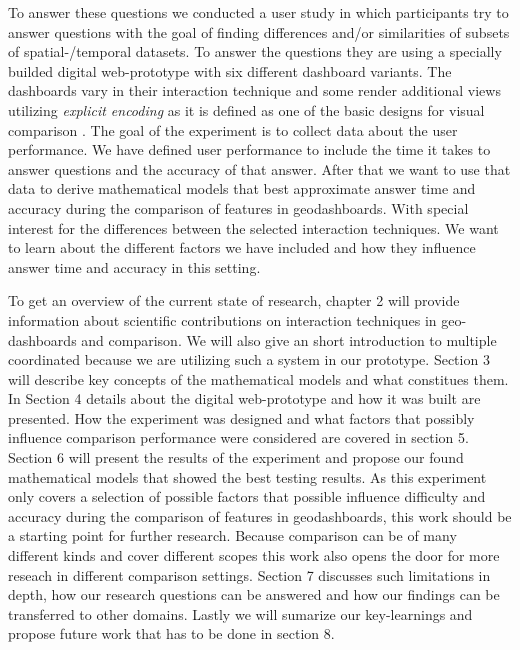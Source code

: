 To answer these questions we conducted a user study in which participants try to answer
questions with the goal of finding differences and/or similarities of subsets
of spatial-/temporal datasets. To answer the
questions they are using a specially builded digital web-prototype with six different dashboard
variants. The dashboards vary in their interaction technique and some render additional views
utilizing \textit{explicit encoding} as it is defined as one of the basic designs for visual
comparison \citep*{Gleicher.2018}. The goal of the experiment is to collect data about the user
performance. We have defined user performance to include the time it takes to answer questions
and the accuracy of that answer. After that we want to use that data to derive mathematical
models that best approximate answer time and accuracy during the comparison of features in
geodashboards. With special interest for the differences between the selected interaction
techniques. We want to learn about the different factors we have included and how they
influence answer time and accuracy in this setting.

To get an overview of the current state of research, chapter 2 will provide information
about scientific contributions on interaction techniques in geo-dashboards and comparison.
We will also give an short introduction to multiple coordinated because we are utilizing
such a system in our prototype. Section 3 will describe key concepts of the mathematical models and
what constitues them. In Section 4 details about the digital web-prototype and how it was built are presented.
How the experiment was designed and what factors that possibly influence comparison performance were considered
are covered in section 5. Section 6 will present the results of the experiment and propose our found
mathematical models that showed the best testing results.
As this experiment only covers a selection of possible factors that possible influence difficulty and
accuracy during the comparison of features in geodashboards, this work should be a starting point for
further research. Because comparison can be of many different kinds and cover different scopes this work
also opens the door for more reseach in different comparison settings. Section 7 discusses such limitations
in depth, how our research questions can be answered and how our findings can be transferred to other domains.
Lastly we will sumarize our key-learnings and propose future work that has to be done in section 8.